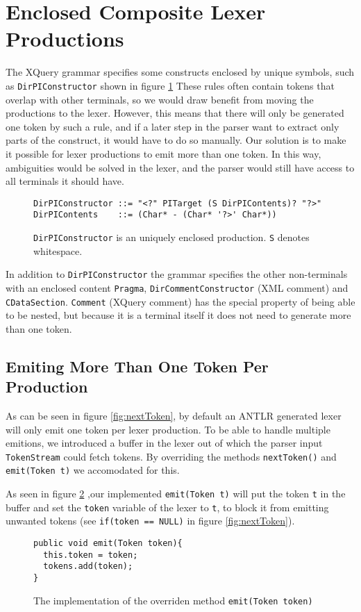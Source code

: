\section{Enclosed Composite Lexer Productions}
\label{sect:rewriteGrammar:enclosedComposite}
 The XQuery grammar specifies some constructs enclosed by unique symbols, such as \verb!DirPIConstructor! shown in figure \ref{fig:pragma} These rules often contain tokens that overlap with other terminals, so we would draw benefit from moving the productions to the lexer. However, this means that there will only be generated one token by such a rule, and if a later step in the parser want to extract only parts of the construct, it would have to do so manually. Our solution is to make it possible for lexer productions to emit more than one token. In this way, ambiguities would be solved in the lexer, and the parser would still have access to all terminals it should have.

\begin{figure}[h!]
\begin{verbatim}
DirPIConstructor ::= "<?" PITarget (S DirPIContents)? "?>"
DirPIContents    ::= (Char* - (Char* '?>' Char*))
\end{verbatim}
\label{fig:pragma}
\caption[An enclosed production]{\texttt{DirPIConstructor} is an uniquely enclosed production. \texttt{S} denotes whitespace.}
\end{figure}

In addition to \verb!DirPIConstructor! the grammar specifies the other non-terminals with an enclosed content \verb!Pragma!,  \verb!DirCommentConstructor! (XML comment) and \verb!CDataSection!. \verb!Comment! (XQuery comment) has the special property of being able to be nested, but because it is a terminal itself it does not need to generate more than one token.

\subsection{Emiting More Than One Token Per Production}
\label{sect:implementation:emittingMoreTokens}
As can be seen in figure \ref{fig:nextToken}, by default an ANTLR generated lexer will only emit one token per lexer production. To be able to handle multiple emitions, we introduced a buffer in the lexer out of which the parser input \verb!TokenStream! could fetch tokens. By overriding the methods \verb!nextToken()! and \verb!emit(Token t)! we accomodated for this. 

As seen in figure \ref{fig:emitToken} ,our implemented \verb!emit(Token t)! will put the token \verb!t! in the buffer and set the \verb!token! variable of the lexer to \verb!t!, to block it from emitting unwanted tokens (see \verb!if(token == NULL)! in figure \ref{fig:nextToken}).
\begin{figure}[h!]
\begin{verbatim}
public void emit(Token token){
  this.token = token;
  tokens.add(token);
}
\end{verbatim}
\caption[The overridden \texttt{emit(Token t)}]{The implementation of the overriden method \texttt{emit(Token token)}}
\label{fig:emitToken}
\end{figure}

